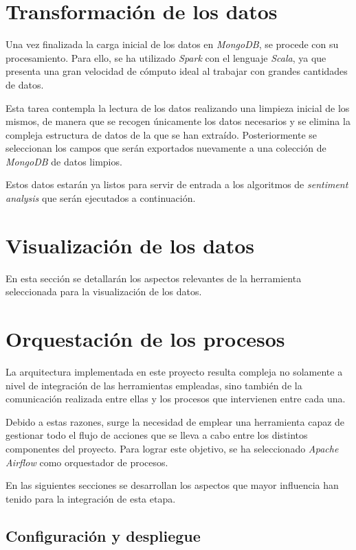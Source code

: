 \section{Transformación de los datos}

Una vez finalizada la carga inicial de los datos en \textit{MongoDB}, se procede con su procesamiento. Para ello, se ha utilizado \textit{Spark} con el lenguaje \textit{Scala}, ya que presenta una gran velocidad de cómputo ideal al trabajar con grandes cantidades de datos.

Esta tarea contempla la lectura de los datos realizando una limpieza inicial de los mismos, de manera que se recogen únicamente los datos necesarios y se elimina la compleja estructura de datos de la que se han extraído. Posteriormente se seleccionan los campos que serán exportados nuevamente a una colección de \textit{MongoDB} de datos limpios.

Estos datos estarán ya listos para servir de entrada a los algoritmos de \textit{sentiment analysis} que serán ejecutados a continuación.

\section{Visualización de los datos}

En esta sección se detallarán los aspectos relevantes de la herramienta seleccionada para la visualización de los datos.

\section{Orquestación de los procesos}

La arquitectura implementada en este proyecto resulta compleja no solamente a nivel de integración de las herramientas empleadas, sino también de la comunicación realizada entre ellas y los procesos que intervienen entre cada una.

Debido a estas razones, surge la necesidad de emplear una herramienta capaz de gestionar todo el flujo de acciones que se lleva a cabo entre los distintos componentes del proyecto. Para lograr este objetivo, se ha seleccionado \textit{Apache Airflow} como orquestador de procesos.

En las siguientes secciones se desarrollan los aspectos que mayor influencia han tenido para la integración de esta etapa.

\subsection{Configuración y despliegue}

